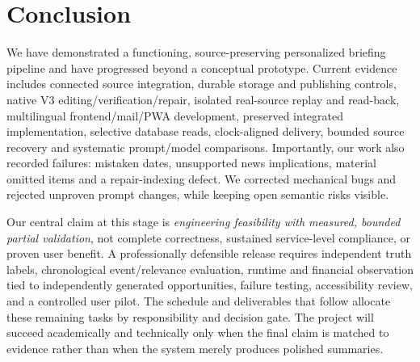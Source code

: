 \chapter{Conclusion}\label{chap:conclusion}
We have demonstrated a functioning, source-preserving personalized briefing pipeline and have progressed beyond a conceptual prototype. Current evidence includes connected source integration, durable storage and publishing controls, native V3 editing/verification/repair, isolated real-source replay and read-back, multilingual frontend/mail/PWA development, preserved integrated implementation, selective database reads, clock-aligned delivery, bounded source recovery and systematic prompt/model comparisons. Importantly, our work also recorded failures: mistaken dates, unsupported news implications, material omitted items and a repair-indexing defect. We corrected mechanical bugs and rejected unproven prompt changes, while keeping open semantic risks visible.

Our central claim at this stage is \emph{engineering feasibility with measured, bounded partial validation}, not complete correctness, sustained service-level compliance, or proven user benefit. A professionally defensible release requires independent truth labels, chronological event/relevance evaluation, runtime and financial observation tied to independently generated opportunities, failure testing, accessibility review, and a controlled user pilot. The schedule and deliverables that follow allocate these remaining tasks by responsibility and decision gate. The project will succeed academically and technically only when the final claim is matched to evidence rather than when the system merely produces polished summaries.
